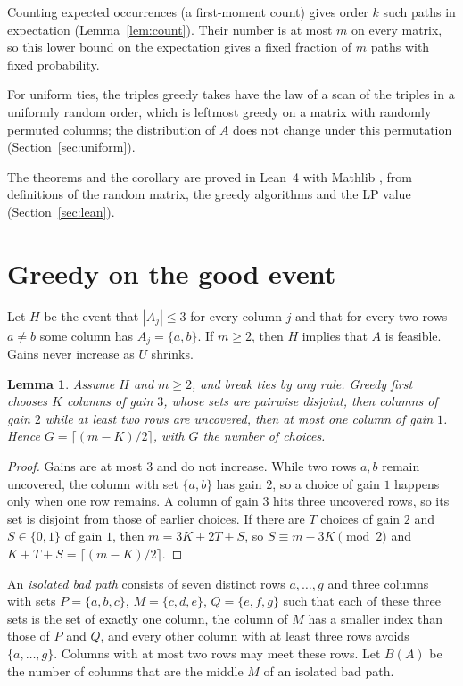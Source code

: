 \documentclass[11pt]{article}
\newtheorem{lemma}[theorem]{Lemma}
\theoremstyle{remark}
\begin{document}
Counting expected occurrences (a first-moment count) gives order $k$ such
paths in expectation (Lemma~\ref{lem:count}). Their number is at most $m$
on every matrix, so this lower bound on the expectation gives a fixed
fraction of $m$ paths with fixed probability.

For uniform ties, the triples greedy takes have the law of a scan of the
triples in a uniformly random order, which is leftmost greedy on a matrix
with randomly permuted columns; the distribution of $A$ does not change
under this permutation (Section~\ref{sec:uniform}).

The theorems and the corollary are proved in Lean~4 \cite{Lean4} with
Mathlib \cite{Mathlib}, from
definitions of the random matrix, the greedy algorithms and the LP value
(Section~\ref{sec:lean}).

\section{Greedy on the good event}

Let $H$ be the event that $|A_j|\le3$ for every column $j$ and that for
every two rows $a\ne b$ some column has $A_j=\{a,b\}$. If $m\ge2$, then $H$
implies that $A$ is feasible. Gains never increase as $U$ shrinks.

\begin{lemma}\label{lem:phases}
Assume $H$ and $m\ge2$, and break ties by any rule. Greedy first chooses
$K$ columns of gain $3$, whose sets are pairwise disjoint, then columns of
gain $2$ while at least two rows are uncovered, then at most one column
of gain $1$. Hence $G=\lceil(m-K)/2\rceil$, with $G$ the number of
choices.
\end{lemma}

\begin{proof}
Gains are at most $3$ and do not increase. While two rows $a,b$ remain
uncovered, the column with set $\{a,b\}$ has gain $2$, so a choice of gain
$1$ happens only when one row remains. A column of gain $3$ hits three
uncovered rows, so its set is disjoint from those of earlier choices. If
there are $T$ choices of gain $2$ and $S\in\{0,1\}$ of gain $1$, then
$m=3K+2T+S$, so $S\equiv m-3K\pmod2$ and $K+T+S=\lceil(m-K)/2\rceil$.
\end{proof}

An \emph{isolated bad path} consists of seven distinct rows $a,\dots,g$
and three columns with sets $P=\{a,b,c\}$, $M=\{c,d,e\}$, $Q=\{e,f,g\}$
such that each of these three sets is the set of exactly one column, the
column of $M$ has a smaller index than those of $P$ and $Q$, and every
other column with at least three rows avoids $\{a,\dots,g\}$. Columns
with at most two rows may meet these rows. Let $B(A)$ be the number of
columns that are the middle $M$ of an isolated bad path.
\end{document}
